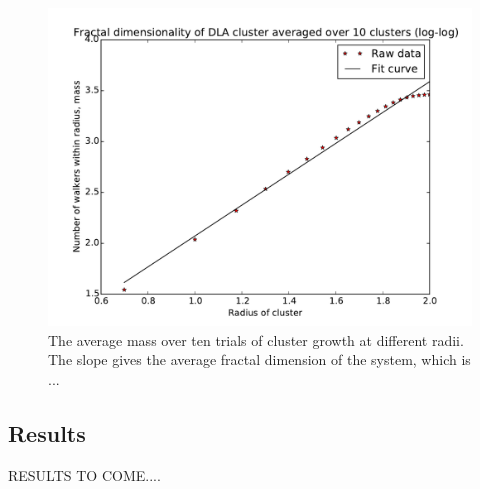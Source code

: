 \documentclass[a4paper,12pt]{article}
\begin{document}
\begin{figure}[htbp]
\begin{center}
\includegraphics[width = \textwidth]{pics/Fractal_dimension_final_avg.pdf}
\caption{The average mass over ten trials of cluster growth at different radii. The slope gives the average fractal dimension of the system, which is ...}
\label{AvgFractalDimension}
\end{center}
\end{figure}



\subsection{Results}  
\indent RESULTS TO COME....
\end{document}
